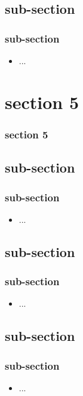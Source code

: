 \documentclass[slidetop,11pt]{beamer}
\begin{document}
\subsection{sub-section}
\begin{frame}
	\frametitle{sub-section}
	\begin{itemize}
		\item ...
	\end{itemize}
\end{frame}

\section{section 5}
\begin{frame}
	\frametitle{section 5}
	\tableofcontents[sections=5,currentsection,subsectionstyle=show/shaded/hide] %
\end{frame}

\subsection{sub-section}
\begin{frame}
	\frametitle{sub-section}
	\begin{itemize}
		\item ...
	\end{itemize}
\end{frame}

\subsection{sub-section}
\begin{frame}
	\frametitle{sub-section}
	\begin{itemize}
		\item ...
	\end{itemize}
\end{frame}

\subsection{sub-section}
\begin{frame}
	\frametitle{sub-section}
	\begin{itemize}
		\item ...
	\end{itemize}
\end{frame}

\end{document}
